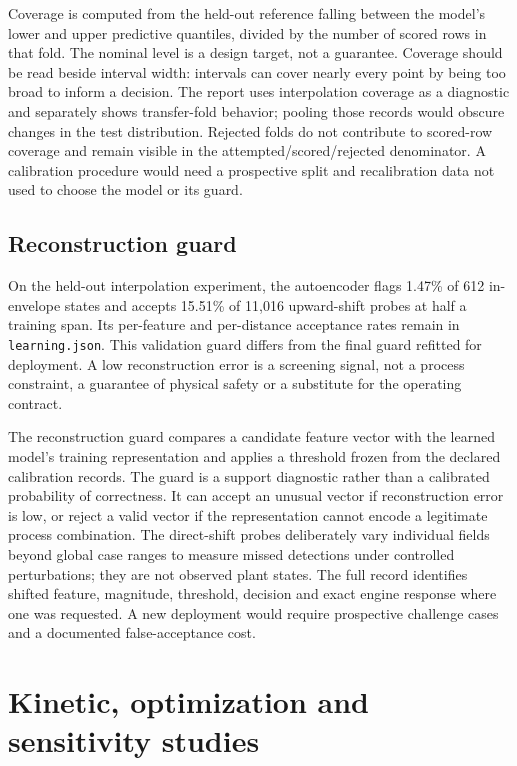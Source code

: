 \documentclass[10pt]{article}
\begin{document}
Coverage is computed from the held-out reference falling between the
model's lower and upper predictive quantiles, divided by the number of
scored rows in that fold. The nominal level is a design target, not a
guarantee. Coverage should be read beside interval width: intervals can
cover nearly every point by being too broad to inform a decision. The
report uses interpolation coverage as a diagnostic and separately shows
transfer-fold behavior; pooling those records would obscure changes in
the test distribution. Rejected folds do not contribute to scored-row
coverage and remain visible in the attempted/scored/rejected
denominator. A calibration procedure would need a prospective split and
recalibration data not used to choose the model or its guard.

\subsection{Reconstruction guard}\label{reconstruction-guard}

On the held-out interpolation experiment, the autoencoder flags 1.47\%
of 612 in-envelope states and accepts 15.51\% of 11,016 upward-shift
probes at half a training span. Its per-feature and per-distance
acceptance rates remain in \texttt{learning.json}. This validation guard
differs from the final guard refitted for deployment. A low
reconstruction error is a screening signal, not a process constraint, a
guarantee of physical safety or a substitute for the operating contract.

The reconstruction guard compares a candidate feature vector with the
learned model's training representation and applies a threshold frozen
from the declared calibration records. The guard is a support diagnostic
rather than a calibrated probability of correctness. It can accept an
unusual vector if reconstruction error is low, or reject a valid vector
if the representation cannot encode a legitimate process combination.
The direct-shift probes deliberately vary individual fields beyond
global case ranges to measure missed detections under controlled
perturbations; they are not observed plant states. The full record
identifies shifted feature, magnitude, threshold, decision and exact
engine response where one was requested. A new deployment would require
prospective challenge cases and a documented false-acceptance cost.

\section{Kinetic, optimization and sensitivity
studies}\label{kinetic-optimization-and-sensitivity-studies}
\end{document}
